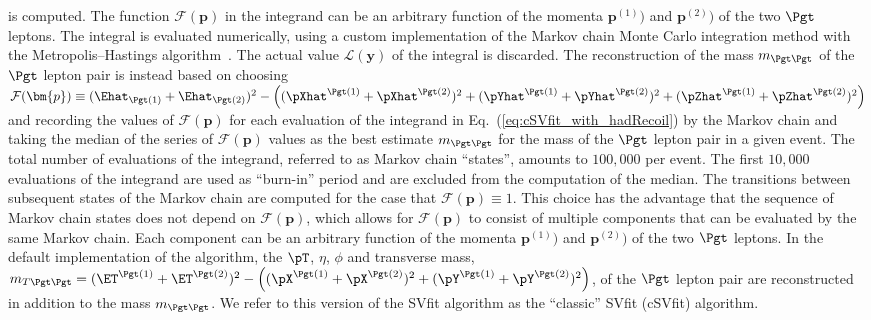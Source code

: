is computed.
The function $\mathcal{F}(\bm{p})$ in the integrand can be an arbitrary function of the momenta $\bm{p}^{(1)})$ and $\bm{p}^{(2)})$ of the two $\Pgt$ leptons.
The integral is evaluated numerically, using a custom implementation of the Markov chain Monte Carlo integration method with the Metropolis–Hastings algorithm~\cite{Metropolis_Hastings}.
The actual value $\mathcal{L}(\bm{y})$ of the integral is discarded.
The reconstruction of the mass $m_{\Pgt\Pgt}$ of the $\Pgt$ lepton pair is instead based on choosing 
$\mathcal{F}(\bm{p}) \equiv (\Ehat_{\Pgt(1)} + \Ehat_{\Pgt(2)})^{2} 
 - \left( (\pXhat^{\Pgt(1)} + \pXhat^{\Pgt(2)})^{2} + (\pYhat^{\Pgt(1)} + \pYhat^{\Pgt(2)})^{2} + (\pZhat^{\Pgt(1)} + \pZhat^{\Pgt(2)})^{2} \right)$
and recording the values of $\mathcal{F}(\bm{p})$ for each evaluation of the integrand in Eq.~(\ref{eq:cSVfit_with_hadRecoil}) by the Markov chain
and taking the median of the series of $\mathcal{F}(\bm{p})$ values
as the best estimate $m_{\Pgt\Pgt}$ for the mass of the $\Pgt$ lepton pair in a given event.
The total number of evaluations of the integrand, referred to as Markov chain ``states'',  
amounts to $100,000$ per event. The first $10,000$ evaluations of the integrand are used as ``burn-in'' period and are excluded from the computation of the median.
The transitions between subsequent states of the Markov chain are computed for the case that $\mathcal{F}(\bm{p}) \equiv 1$.
This choice has the advantage that the sequence of Markov chain states does not depend on $\mathcal{F}(\bm{p})$,
which allows for $\mathcal{F}(\bm{p})$ to consist of multiple components that can be evaluated by the same Markov chain.
Each component can be an arbitrary function of the momenta $\bm{p}^{(1)})$ and $\bm{p}^{(2)})$ of the two $\Pgt$ leptons.
In the default implementation of the algorithm,
the $\pT$, $\eta$, $\phi$ and transverse mass, $m_{T\Pgt\Pgt} = (\ET^{\Pgt(1)} + \ET^{\Pgt(2)})^{2} 
 - \left( (\pX^{\Pgt(1)} + \pX^{\Pgt(2)})^{2} + (\pY^{\Pgt(1)} + \pY^{\Pgt(2)})^{2} \right)$, of the $\Pgt$ lepton pair
are reconstructed in addition to the mass $m_{\Pgt\Pgt}$.
We refer to this version of the SVfit algorithm as the ``classic'' SVfit (cSVfit) algorithm.

